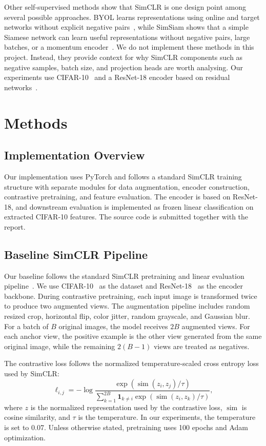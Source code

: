 \documentclass[10pt]{article}
\begin{document}
Other self-supervised methods show that SimCLR is one design point among several possible approaches. BYOL learns representations using online and target networks without explicit negative pairs~\cite{byol}, while SimSiam shows that a simple Siamese network can learn useful representations without negative pairs, large batches, or a momentum encoder~\cite{simsiam}. We do not implement these methods in this project. Instead, they provide context for why SimCLR components such as negative samples, batch size, and projection heads are worth analysing. Our experiments use CIFAR-10~\cite{cifar10} and a ResNet-18 encoder based on residual networks~\cite{resnet}.

\section{Methods}

\subsection{Implementation Overview}

Our implementation uses PyTorch and follows a standard SimCLR training structure with separate modules for data augmentation, encoder construction, contrastive pretraining, and feature evaluation. The encoder is based on ResNet-18, and downstream evaluation is implemented as frozen linear classification on extracted CIFAR-10 features. The source code is submitted together with the report.

\subsection{Baseline SimCLR Pipeline}

Our baseline follows the standard SimCLR pretraining and linear evaluation pipeline~\cite{simclr}. We use CIFAR-10~\cite{cifar10} as the dataset and ResNet-18~\cite{resnet} as the encoder backbone. During contrastive pretraining, each input image is transformed twice to produce two augmented views. The augmentation pipeline includes random resized crop, horizontal flip, color jitter, random grayscale, and Gaussian blur. For a batch of $B$ original images, the model receives $2B$ augmented views. For each anchor view, the positive example is the other view generated from the same original image, while the remaining $2(B-1)$ views are treated as negatives.

The contrastive loss follows the normalized temperature-scaled cross entropy loss used by SimCLR:
\[
\ell_{i,j} =
-\log
\frac{\exp(\operatorname{sim}(z_i,z_j)/\tau)}
{\sum_{k=1}^{2B} \mathbf{1}_{k \ne i}
\exp(\operatorname{sim}(z_i,z_k)/\tau)} ,
\]
where $z$ is the normalized representation used by the contrastive loss, $\operatorname{sim}$ is cosine similarity, and $\tau$ is the temperature. In our experiments, the temperature is set to 0.07. Unless otherwise stated, pretraining uses 100 epochs and Adam optimization.
\end{document}
